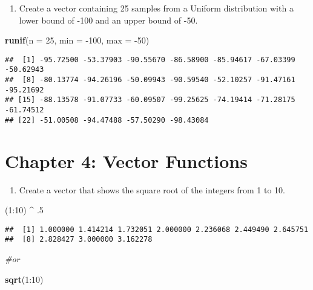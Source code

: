 \documentclass[]{book}
\newenvironment{Shaded}{\begin{snugshade}}{\end{snugshade}}
\newcommand{\KeywordTok}[1]{\textcolor[rgb]{0.13,0.29,0.53}{\textbf{{#1}}}}
\newcommand{\DataTypeTok}[1]{\textcolor[rgb]{0.13,0.29,0.53}{{#1}}}
\newcommand{\DecValTok}[1]{\textcolor[rgb]{0.00,0.00,0.81}{{#1}}}
\newcommand{\StringTok}[1]{\textcolor[rgb]{0.31,0.60,0.02}{{#1}}}
\newcommand{\CommentTok}[1]{\textcolor[rgb]{0.56,0.35,0.01}{\textit{{#1}}}}
\newcommand{\NormalTok}[1]{{#1}}
\providecommand{\tightlist}{%
  \setlength{\itemsep}{0pt}\setlength{\parskip}{0pt}}
\begin{document}
\begin{enumerate}
\def\labelenumi{\arabic{enumi}.}
\setcounter{enumi}{8}
\tightlist
\item
  Create a vector containing 25 samples from a Uniform distribution with
  a lower bound of -100 and an upper bound of -50.
\end{enumerate}

\begin{Shaded}
\begin{Highlighting}[]
\KeywordTok{runif}\NormalTok{(}\DataTypeTok{n =} \DecValTok{25}\NormalTok{, }\DataTypeTok{min =} \NormalTok{-}\DecValTok{100}\NormalTok{, }\DataTypeTok{max =} \NormalTok{-}\DecValTok{50}\NormalTok{)}
\end{Highlighting}
\end{Shaded}

\begin{verbatim}
##  [1] -95.72500 -53.37903 -90.55670 -86.58900 -85.94617 -67.03399 -50.62943
##  [8] -80.13774 -94.26196 -50.09943 -90.59540 -52.10257 -91.47161 -95.21692
## [15] -88.13578 -91.07733 -60.09507 -99.25625 -74.19414 -71.28175 -61.74512
## [22] -51.00508 -94.47488 -57.50290 -98.43084
\end{verbatim}

\section{Chapter 4: Vector Functions}\label{chapter-4-vector-functions}

\begin{enumerate}
\def\labelenumi{\arabic{enumi}.}
\tightlist
\item
  Create a vector that shows the square root of the integers from 1 to
  10.
\end{enumerate}

\begin{Shaded}
\begin{Highlighting}[]
\NormalTok{(}\DecValTok{1}\NormalTok{:}\DecValTok{10}\NormalTok{) ^}\StringTok{ }\NormalTok{.}\DecValTok{5}
\end{Highlighting}
\end{Shaded}

\begin{verbatim}
##  [1] 1.000000 1.414214 1.732051 2.000000 2.236068 2.449490 2.645751
##  [8] 2.828427 3.000000 3.162278
\end{verbatim}

\begin{Shaded}
\begin{Highlighting}[]
\CommentTok{#or}

\KeywordTok{sqrt}\NormalTok{(}\DecValTok{1}\NormalTok{:}\DecValTok{10}\NormalTok{)}
\end{Highlighting}
\end{Shaded}
\end{document}
